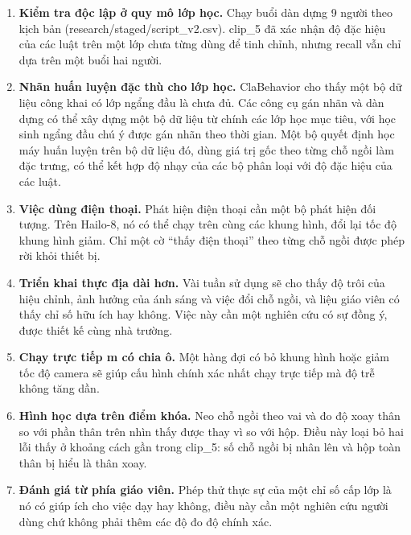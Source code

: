 \begin{enumerate}
\def\labelenumi{\arabic{enumi}.}
\tightlist
\item
  \textbf{Kiểm tra độc lập ở quy mô lớp học.} Chạy buổi dàn dựng 9 người theo kịch bản (research/staged/script\_v2.csv). clip\_5 đã xác nhận độ đặc hiệu của các luật trên một lớp chưa từng dùng để tinh chỉnh, nhưng recall vẫn chỉ dựa trên một buổi hai người.
\item
  \textbf{Nhãn huấn luyện đặc thù cho lớp học.} ClaBehavior cho thấy một bộ dữ liệu công khai có lớp ngẩng đầu là chưa đủ. Các công cụ gán nhãn và dàn dựng có thể xây dựng một bộ dữ liệu từ chính các lớp học mục tiêu, với học sinh ngẩng đầu chú ý được gán nhãn theo thời gian. Một bộ quyết định học máy huấn luyện trên bộ dữ liệu đó, dùng giá trị gốc theo từng chỗ ngồi làm đặc trưng, có thể kết hợp độ nhạy của các bộ phân loại với độ đặc hiệu của các luật.
\item
  \textbf{Việc dùng điện thoại.} Phát hiện điện thoại cần một bộ phát hiện đối tượng. Trên Hailo-8, nó có thể chạy trên cùng các khung hình, đổi lại tốc độ khung hình giảm. Chỉ một cờ ``thấy điện thoại'' theo từng chỗ ngồi được phép rời khỏi thiết bị.
\item
  \textbf{Triển khai thực địa dài hơn.} Vài tuần sử dụng sẽ cho thấy độ trôi của hiệu chỉnh, ảnh hưởng của ánh sáng và việc đổi chỗ ngồi, và liệu giáo viên có thấy chỉ số hữu ích hay không. Việc này cần một nghiên cứu có sự đồng ý, được thiết kế cùng nhà trường.
\item
  \textbf{Chạy trực tiếp m có chia ô.} Một hàng đợi có bỏ khung hình hoặc giảm tốc độ camera sẽ giúp cấu hình chính xác nhất chạy trực tiếp mà độ trễ không tăng dần.
\item
  \textbf{Hình học dựa trên điểm khóa.} Neo chỗ ngồi theo vai và đo độ xoay thân so với phần thân trên nhìn thấy được thay vì so với hộp. Điều này loại bỏ hai lỗi thấy ở khoảng cách gần trong clip\_5: số chỗ ngồi bị nhân lên và hộp toàn thân bị hiểu là thân xoay.
\item
  \textbf{Đánh giá từ phía giáo viên.} Phép thử thực sự của một chỉ số cấp lớp là nó có giúp ích cho việc dạy hay không, điều này cần một nghiên cứu người dùng chứ không phải thêm các độ đo độ chính xác.
\end{enumerate}
